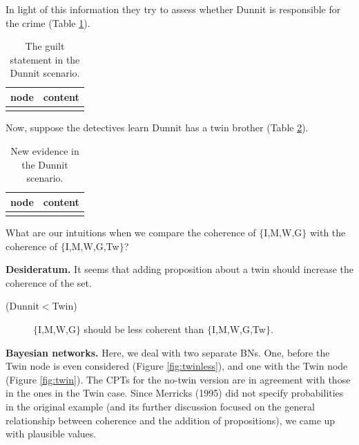 \documentclass[
  10pt,
]{scrartcl}
\newcommand{\s}[1]{\textsf{#1}}
\begin{document}
\noindent In light of this information they try to assess whether Dunnit is responsible for the crime (Table \ref{tab:dunnitPropositions2}).

\begin{table}[H]

\caption{\label{tab:dunnitPropositions2}The guilt statement in the Dunnit scenario.}
\centering
\begin{tabular}[t]{l>{\raggedright\arraybackslash}p{25em}}
\toprule
node & content\\
\midrule
\cellcolor{gray!6}{G} & \cellcolor{gray!6}{Dunnit is guilty.}\\
\bottomrule
\end{tabular}
\end{table}

\noindent Now, suppose the detectives learn Dunnit has a twin brother (Table \ref{tab:dunnitPropositions3}).

\begin{table}[H]

\caption{\label{tab:dunnitPropositions3}New evidence in the Dunnit scenario.}
\centering
\begin{tabular}[t]{l>{\raggedright\arraybackslash}p{25em}}
\toprule
node & content\\
\midrule
\cellcolor{gray!6}{Tw} & \cellcolor{gray!6}{Dunnit has an identical twin which was seen by the credible witness two hundred miles from the scene of the crime during the murder.}\\
\bottomrule
\end{tabular}
\end{table}

\noindent What are our intuitions when we compare the coherence of \(\{\)\s{I,M,W,G}\(\}\) with the coherence of \(\{\)\s{I,M,W,G,Tw}\(\}\)?

\noindent \textbf{Desideratum.} It seems that adding proposition about a twin should increase the coherence of the set.

\vspace{2mm}\begin{description}
    \item[(Dunnit$<$Twin)] $\{$\s{I,M,W,G}$\}$ should be less coherent than $\{$\s{I,M,W,G,Tw}$\}$. 
\end{description}\vspace{2mm}

\textbf{Bayesian networks.} Here, we deal with two separate BNs. One, before the \textsf{Twin} node is even considered (Figure \ref{fig:twinless}), and one with the \textsf{Twin} node (Figure \ref{fig:twin}). The CPTs for the no-twin version are in agreement with those in the ones in the Twin case. Since Merricks (1995) did not specify probabilities in the original example (and its further discussion focused on the general relationship between coherence and the addition of propositions), we came up with plausible values.
\end{document}
